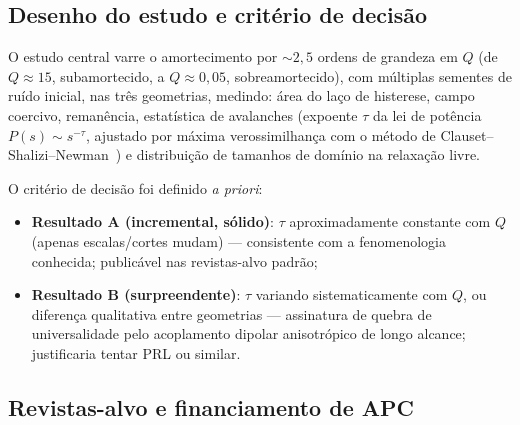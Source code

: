\documentclass[11pt,a4paper]{article}
\begin{document}
\subsection{Desenho do estudo e critério de decisão}

O estudo central varre o amortecimento por $\sim 2{,}5$ ordens de
grandeza em $Q$ (de $Q \approx 15$, subamortecido, a $Q \approx 0{,}05$,
sobreamortecido), com múltiplas sementes de ruído inicial, nas três
geometrias, medindo: área do laço de histerese, campo coercivo,
remanência, estatística de avalanches (expoente $\tau$ da lei de
potência $P(s) \sim s^{-\tau}$, ajustado por máxima verossimilhança com
o método de Clauset--Shalizi--Newman~\cite{clauset2009}) e distribuição
de tamanhos de domínio na relaxação livre.

O critério de decisão foi definido \emph{a priori}:
\begin{itemize}
\item \textbf{Resultado A (incremental, sólido)}: $\tau$ aproximadamente
constante com $Q$ (apenas escalas/cortes mudam) --- consistente com a
fenomenologia conhecida; publicável nas revistas-alvo padrão;
\item \textbf{Resultado B (surpreendente)}: $\tau$ variando
sistematicamente com $Q$, ou diferença qualitativa entre geometrias ---
assinatura de quebra de universalidade pelo acoplamento dipolar
anisotrópico de longo alcance; justificaria tentar PRL ou similar.
\end{itemize}

\subsection{Revistas-alvo e financiamento de APC}
\end{document}
